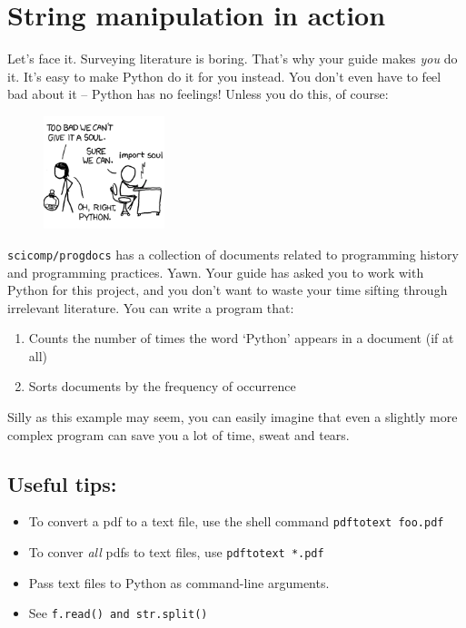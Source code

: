 \documentclass{article}
\begin{document}
\section*{String manipulation in action}
Let's face it. Surveying literature is boring. That's why your guide makes 
\emph{you} do it. It's easy to make Python do it for you instead. You don't even
have to feel bad about it -- Python has no feelings! Unless you do this, of course:
\begin{figure}[h]
\begin{center}
\includegraphics[width=100pt]{../pictures/import_soul.png}
\end{center}
\end{figure}
\newline \texttt{scicomp/progdocs} has a collection of documents related to programming
history and programming practices. Yawn. Your guide has asked you to work
with Python for this project, and you don't want to waste your time sifting through
irrelevant literature. You can write a program that:
\begin{enumerate}
\item Counts the number of times the word `Python' appears in a document (if at all)
\item Sorts documents by the frequency of occurrence
\end {enumerate}
Silly as this example may seem, you can easily imagine that even a slightly
more complex program can save you a lot of time, sweat and tears.
\subsection*{Useful tips:}
\begin{itemize}
\item To convert a pdf to a text file, use the shell command \texttt{pdftotext foo.pdf}
\item To conver \emph{all} pdfs to text files, use \texttt{pdftotext *.pdf}
\item Pass text files to Python as command-line arguments.
\item See \texttt{f.read() and str.split()}
\end{itemize}
\end{document}

